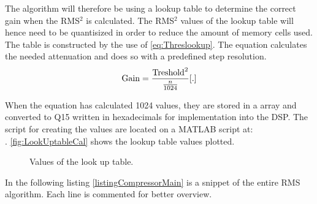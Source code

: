 The algorithm will therefore be using a lookup table to determine the correct gain when the RMS$^2$ is calculated. The RMS$^2$ values of the lookup table will hence need to be quantisized in order to reduce the amount of memory cells used. The table is constructed by the use of \autoref{eq:Threslookup}. The equation calculates the needed attenuation and does so with a predefined step resolution. 
\vspace{-2mm}
\begin{equation}\label{eq:Threslookup}
\text{Gain}=\frac{\text{Treshold}^2}{\frac{n}{1024}}\enhed{.}
\end{equation}
\begin{where}
\end{where}

\vspace{2mm}
When the equation has calculated 1024 values, they are stored in a array and converted to Q15 written in hexadecimals for implementation into the DSP.
The script for creating the values are located on a MATLAB script at: \\
. \autoref{fig:LookUptableCal} shows the lookup table values plotted.

\begin{figure}[H]
	\centering
	
	\caption{Values of the look up table.}
	\label{fig:LookUptableCal}
\end{figure}


In the following listing \ref{listingCompressorMain} is a snippet of the entire RMS algorithm. Each line is commented for better overview.

